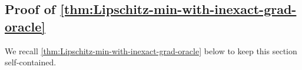 \subsection{Proof of \cref{thm:Lipschitz-min-with-inexact-grad-oracle}}



We recall  \cref{thm:Lipschitz-min-with-inexact-grad-oracle} below to keep this section self-contained. 

\thmLipscMinWithInexactGradOracle*



